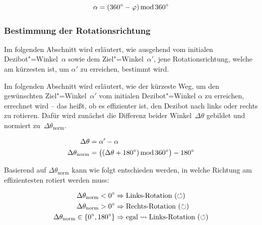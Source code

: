 \vspace{-1em}

\begin{equation*}
    \alpha = (360^\circ - \varphi) \operatorname{mod} 360^\circ
\end{equation*}


\subsubsection{Bestimmung der Rotationsrichtung}
\label{sec:rotation-direction-determination}

Im folgenden Abschnitt wird erläutert, wie ausgehend vom initialen Dezibot"=Winkel~$\alpha$ sowie dem Ziel"=Winkel~$\alpha'$, jene Rotationsrichtung, welche am kürzesten ist, um $\alpha'$ zu erreichen, bestimmt wird.

Im folgenden Abschnitt wird erläutert, wie der kürzeste Weg, um den gewünschten Ziel"=Winkel~$\alpha'$ vom initialen Dezibot"=Winkel $\alpha$ zu erreichen, errechnet wird -- das heißt, ob es effizienter ist, den Dezibot nach links oder rechts zu rotieren. Dafür wird zunächst die Differenz beider Winkel~$\Delta\theta$ gebildet und normiert zu~$\Delta\theta_{\text{norm}}$.

\vspace{-1em}
\begin{equation*}
\begin{aligned}
    \Delta\theta &= \alpha' - \alpha \\
    \Delta\theta_{\text{norm}} &= \big( (\Delta\theta + 180^\circ) \operatorname{mod} 360^\circ \big) - 180^\circ
\end{aligned}
\end{equation*}

Basierend auf $\Delta\theta_{\text{norm}}$ kann wie folgt entschieden werden, in welche Richtung am effizientesten rotiert werden muss:

\vspace{-1em}
\begin{equation*}
\begin{aligned}
    \Delta\theta_{\text{norm}} < 0^\circ &\Rightarrow \text{Links-Rotation} ~(\circlearrowleft)\\
    \Delta\theta_{\text{norm}} > 0^\circ &\Rightarrow \text{Rechts-Rotation} ~(\circlearrowright)\\
    \Delta\theta_{\text{norm}} \in \lbrace 0^\circ, 180^\circ \rbrace &\Rightarrow \text{egal} \leadsto \text{Links-Rotation} ~(\circlearrowleft)
\end{aligned}
\end{equation*}

